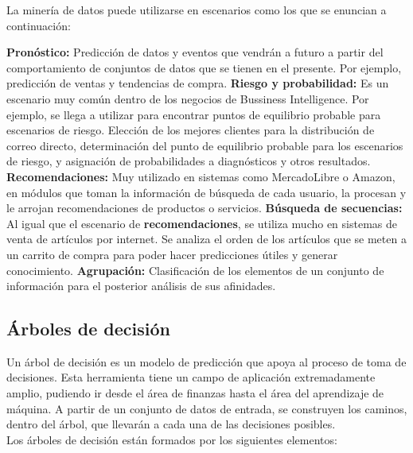 La minería de datos puede utilizarse en escenarios como los que se enuncian a continuación: \\
\begin{UClist}
	\UCli \textbf{Pronóstico:} Predicción de datos y eventos que vendrán a futuro a partir del comportamiento de conjuntos de datos que se tienen en el presente. Por ejemplo, predicción de ventas y tendencias de compra.
	\UCli \textbf{Riesgo y probabilidad:} Es un escenario muy común dentro de los negocios de Bussiness Intelligence. Por ejemplo, se llega a utilizar para encontrar puntos de equilibrio probable para escenarios de riesgo.
	Elección de los mejores clientes para la distribución de correo directo, determinación del punto de equilibrio probable para los escenarios de riesgo, y asignación de probabilidades a diagnósticos y otros resultados.
	\UCli \textbf{Recomendaciones:} Muy utilizado en sistemas como MercadoLibre o Amazon, en módulos que toman la información de búsqueda de cada usuario, la procesan y le arrojan recomendaciones de productos o servicios.
	\UCli \textbf{Búsqueda de secuencias:} Al igual que el escenario de \textbf{recomendaciones}, se utiliza mucho en sistemas de venta de artículos por internet. Se analiza el orden de los artículos que se meten a un carrito de compra para poder hacer predicciones útiles y generar conocimiento.
	\UCli \textbf{Agrupación:} Clasificación de los elementos de un conjunto de información para el posterior análisis de sus afinidades.
\end{UClist}

\subsection{Árboles de decisión}
Un árbol de decisión es un modelo de predicción que apoya al proceso de toma de decisiones. Esta herramienta tiene un campo de aplicación extremadamente amplio, pudiendo ir desde el área de finanzas hasta el área del aprendizaje de máquina. A partir de un conjunto de datos de entrada, se construyen los caminos, dentro del árbol, que llevarán a cada una de las decisiones posibles.\\

Los árboles de decisión están formados por los siguientes elementos:\\

